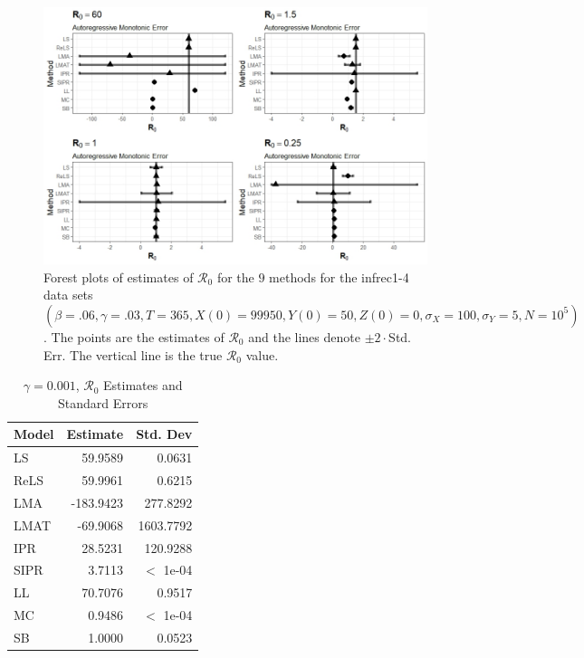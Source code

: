 \documentclass[12pt]{article}
\newcommand{\xxsir}{\ensuremath{9} } %
\newcommand{\rr}{\ensuremath{\mathcal{R}_0}}
\begin{document}
\begin{figure}[H]
	\centering
	\includegraphics[scale=0.5]{images/parchange_arm.jpeg}
	\caption{Forest plots of estimates of $\rr$ for the \xxsir methods for the infrec1-4 data sets $(\beta=.06, \gamma=.03, T=365, X(0)=99950, Y(0)=50, Z(0)=0, \sigma_X=100, \sigma_Y=5, N=10^5)$.  The points are the estimates of $\rr$ and the lines denote $\pm 2\cdot $Std. Err.  The vertical line is the true $\rr$ value.}
\end{figure}
\begin{table}[H]
	
	\centering
	\begin{tabular}[t]{l|r|r}
		\hline
		Model & Estimate & Std. Dev\\
		\hline
		LS & 59.9589 & 0.0631\\
		\hline
		ReLS & 59.9961 & 0.6215\\
		\hline
		LMA & -183.9423 & 277.8292\\
		\hline
		LMAT & -69.9068 & 1603.7792\\
		\hline
		IPR & 28.5231 & 120.9288\\
		\hline
		SIPR & 3.7113 & $<$ 1e-04\\
		\hline
		LL & 70.7076 & 0.9517\\
		\hline
		MC & 0.9486 & $<$ 1e-04\\
		\hline
		SB & 1.0000 & 0.0523\\
		\hline
	\end{tabular}
	\caption{$\gamma = 0.001$, $\rr$ Estimates and Standard Errors}
\end{table}
\end{document}
